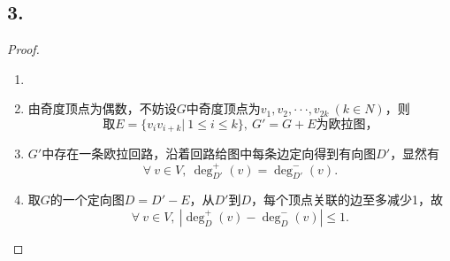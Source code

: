 \documentclass{article}
\begin{document}
\subsection*{3.}
\begin{proof}
    \begin{enumerate}
        \item []
        \item []
        由奇度顶点为偶数，不妨设$G$中奇度顶点为$v_1,v_2,···,v_{2k}\ (k\in N)$，则
        \[
            \mbox{取}E=\{v_i v_{i+k}|\ 1\leq i\leq k \},\ G'=G+E
            \mbox{为欧拉图，}
        \]
        \item []
        $G'$中存在一条欧拉回路，沿着回路给图中每条边定向得到有向图$D'$，显然有
        \[
            \forall\ v \in V,\ 
            \deg_{D'}^+ (v)=\deg_{D'} ^- (v).
        \]
        \item []
        取$G$的一个定向图$D=D'-E$，从$D'$到$D$，每个顶点关联的边至多减少1，故
        \[
            \forall\ v\in V,\ 
            |\deg_{D}^+ (v)-\deg_{D} ^-(v)|\leq 1.
        \]
    \end{enumerate}
\end{proof}
\end{document}
